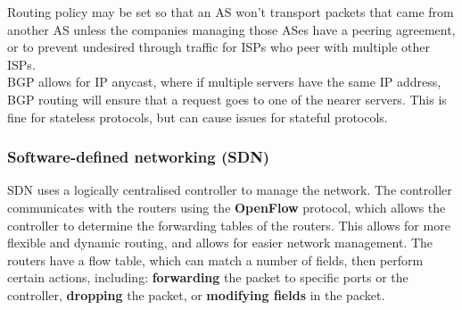 Routing policy may be set so that an AS won't transport packets that came from another AS unless the companies managing those ASes have a peering agreement, or to prevent undesired through traffic for ISPs who peer with multiple other ISPs.\\
BGP allows for IP anycast, where if multiple servers have the same IP address, BGP routing will ensure that a request goes to one of the nearer servers. This is fine for stateless protocols, but can cause issues for stateful protocols.\\
\subsubsection{Software-defined networking (SDN)}
SDN uses a logically centralised controller to manage the network. The controller communicates with the routers using the \textbf{OpenFlow} protocol, which allows the controller to determine the forwarding tables of the routers. This allows for more flexible and dynamic routing, and allows for easier network management. The routers have a flow table, which can match a number of fields, then perform certain actions, including: \textbf{forwarding} the packet to specific ports or the controller, \textbf{dropping} the packet, or \textbf{modifying fields} in the packet.


